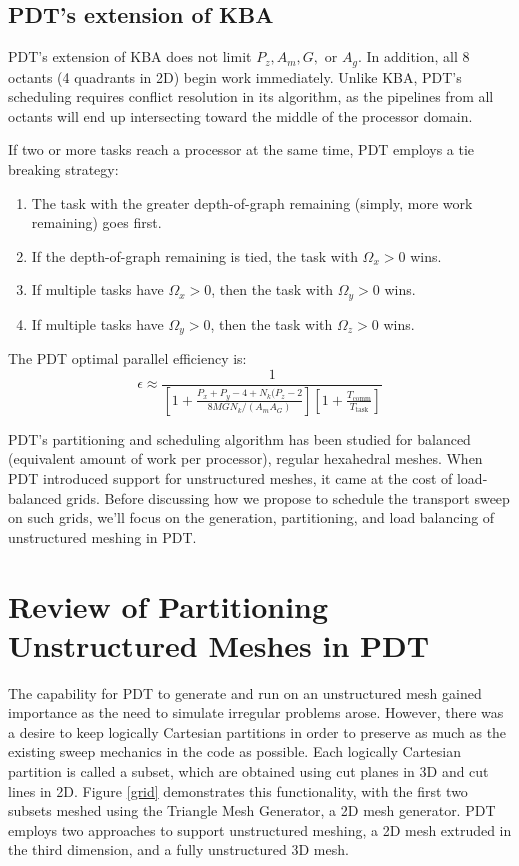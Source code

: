 \documentclass[11pt, letterpaper,titlepage,oneside]{article}
\begin{document}
\subsection{PDT's extension of KBA}\label {pdt_extension}

PDT's extension of KBA does not limit $P_z, A_m, G,$ or $A_g$. In addition, all 8 octants (4 quadrants in 2D) begin work immediately. Unlike KBA, PDT's scheduling requires conflict resolution in its algorithm, as the pipelines from all octants will end up intersecting toward the middle of the processor domain.

If two or more tasks reach a processor at the same time, PDT employs a tie breaking strategy:

\begin{enumerate}
	\item The task with the greater depth-of-graph remaining (simply, more work remaining) goes first.
	\item If the depth-of-graph remaining is tied, the task with $\Omega_x > 0$ wins.
	\item If multiple tasks have $\Omega_x > 0$, then the task with $\Omega_y > 0$ wins.
	\item If multiple tasks have $\Omega_y > 0$, then the task with $\Omega_z > 0$ wins.
\end{enumerate}

The PDT optimal parallel efficiency\cite{mpadams2013} is:
\begin{equation}
	\epsilon \approx \frac{1}{ [1 + \frac{P_x + P_y - 4 + N_k(P_z -2}{8MGN_k/(A_m A_G)} ]  [ 1 +  \frac{T_{\text{comm}}}{T_{\text{task}}} ]}
\end{equation}

PDT's partitioning and scheduling algorithm has been studied for balanced (equivalent amount of work per processor), regular hexahedral meshes. When PDT introduced support for unstructured meshes, it came at the cost of load-balanced grids. Before discussing how we propose to schedule the transport sweep on such grids, we'll focus on the generation, partitioning, and load balancing of unstructured meshing in PDT.

\section{Review of Partitioning Unstructured Meshes in PDT}

The capability for PDT to generate and run on an unstructured mesh gained importance as the need to simulate irregular problems arose. However, there was a desire to keep logically Cartesian partitions in order to preserve as much as the existing sweep mechanics in the code as possible. Each logically Cartesian partition is called a subset, which are obtained using cut planes in 3D and cut lines in 2D. Figure \ref{grid} demonstrates this functionality, with the first two subsets meshed using the Triangle Mesh Generator\cite{triangle}, a 2D mesh generator. PDT employs two approaches to support unstructured meshing, a 2D mesh extruded in the third dimension, and a fully unstructured 3D mesh.
\end{document}
